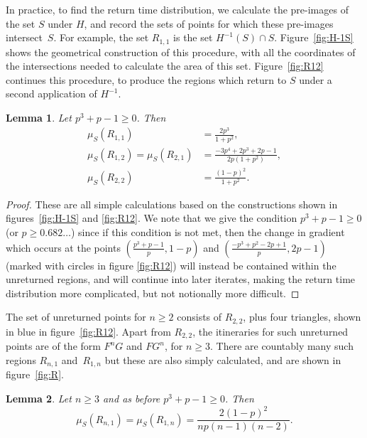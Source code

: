 \documentclass{iopart}
\newtheorem{lemma}{Lemma}
\begin{document}
In practice, to find the return time distribution, we calculate the pre-images of the set $S$ under $H$, and record the sets of points for which these pre-images intersect~$S$. For example, the set $R_{1,1}$ is the set $H^{-1}(S) \cap S$. Figure~\ref{fig:H-1S} shows the geometrical construction of this procedure, with all the coordinates of the intersections needed to calculate the area of this set. Figure~\ref{fig:R12} continues this 
procedure, to produce the regions which return to $S$ under a second application of $H^{-1}$. 
\begin{lemma}\label{lem:Rsets}
Let $p^3 + p - 1 \ge 0$. Then
\begin{align*}
\mu_S (R_{1,1}) &= \frac{2p^3}{1+p^2}, \\
\mu_S (R_{1,2}) = \mu_S(R_{2,1}) & = \frac{-3p^4+2p^3+2p-1}{2p(1+p^2)}, \\
\mu_S(R_{2,2}) &= \frac{(1-p)^2}{1+p^2}.
\end{align*}
\end{lemma}

\begin{proof}
These are all simple calculations based on the constructions shown in figures~\ref{fig:H-1S} and \ref{fig:R12}. We note that we give the condition 
$p^3 + p - 1 \ge 0$  (or $ p \ge 0.682\ldots$) since if this condition is 
not met, then the change in gradient which occurs at the points $(\frac{p^3+p-1}{p},1-p)$ and $(\frac{-p^3 + p^2 - 2p + 1}{p},2p-1)$ (marked with circles in figure \ref{fig:R12}) will instead be contained within the unreturned regions, and will continue into later iterates, making the return 
time distribution more complicated, but not notionally more difficult.
\end{proof}




The set of unreturned points for $n \ge 2$ consists of $R_{2,2}$, plus four triangles, shown in blue in figure~\ref{fig:R12}. Apart from $R_{2,2}$, the itineraries for such unreturned points are of the form $F^n G$ and $FG^n$, for $n \ge 3$. There are countably many such regions $R_{n,1}$ and~$R_{1,n}$ but these are also simply calculated, and are shown in figure~\ref{fig:R}.
\begin{lemma}\label{lem:Rcountable}
Let $n \ge 3$ and as before $p^3 + p - 1 \ge 0$. Then 
\begin{equation*}
\mu_S(R_{n,1}) = \mu_S(R_{1,n}) = \frac{2(1-p)^2}{np(n-1)(n-2)}.
\end{equation*}
\end{lemma}
\end{document}
